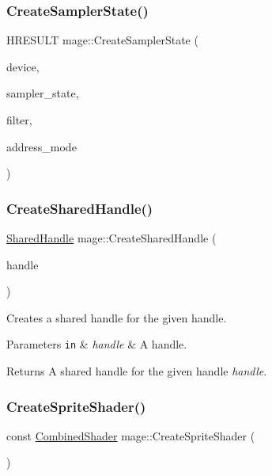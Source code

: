\subsubsection{\texorpdfstring{Create\+Sampler\+State()}{CreateSamplerState()}}
{\footnotesize\ttfamily H\+R\+E\+S\+U\+LT mage\+::\+Create\+Sampler\+State (\begin{DoxyParamCaption}\item[{I\+D3\+D11\+Device2 $\ast$}]{device,  }\item[{I\+D3\+D11\+Sampler\+State $\ast$$\ast$}]{sampler\+\_\+state,  }\item[{D3\+D11\+\_\+\+F\+I\+L\+T\+ER}]{filter,  }\item[{D3\+D11\+\_\+\+T\+E\+X\+T\+U\+R\+E\+\_\+\+A\+D\+D\+R\+E\+S\+S\+\_\+\+M\+O\+DE}]{address\+\_\+mode }\end{DoxyParamCaption})}

\hypertarget{namespacemage_a3119898d7caac71d8ee495c3ae3194b1}{}\label{namespacemage_a3119898d7caac71d8ee495c3ae3194b1} 
\subsubsection{\texorpdfstring{Create\+Shared\+Handle()}{CreateSharedHandle()}}
{\footnotesize\ttfamily \hyperlink{namespacemage_ae70b3368a2dccc985c4ecbdf15a1a3c9}{Shared\+Handle} mage\+::\+Create\+Shared\+Handle (\begin{DoxyParamCaption}\item[{H\+A\+N\+D\+LE}]{handle }\end{DoxyParamCaption})}

Creates a shared handle for the given handle.


\begin{DoxyParams}[1]{Parameters}
\mbox{\tt in}  & {\em handle} & A handle. \\
\hline
\end{DoxyParams}
\begin{DoxyReturn}{Returns}
A shared handle for the given handle {\itshape handle}. 
\end{DoxyReturn}
\hypertarget{namespacemage_a83cda7dcb5f25de3e5564aac5c0efa08}{}\label{namespacemage_a83cda7dcb5f25de3e5564aac5c0efa08} 
\subsubsection{\texorpdfstring{Create\+Sprite\+Shader()}{CreateSpriteShader()}}
{\footnotesize\ttfamily const \hyperlink{structmage_1_1_combined_shader}{Combined\+Shader} mage\+::\+Create\+Sprite\+Shader (\begin{DoxyParamCaption}{ }\end{DoxyParamCaption})}

